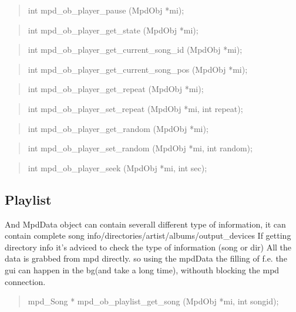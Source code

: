 \documentclass[a4paper,11pt]{article}
\begin{document}
\begin{quote}
int 		mpd\_ob\_player\_pause			(MpdObj *mi);
\end{quote}

\begin{quote}
int 		mpd\_ob\_player\_get\_state			(MpdObj *mi);
\end{quote}

\begin{quote}
int 		mpd\_ob\_player\_get\_current\_song\_id	(MpdObj *mi);
\end{quote}

\begin{quote}
int 		mpd\_ob\_player\_get\_current\_song\_pos	(MpdObj *mi);
\end{quote}

\begin{quote}
int		mpd\_ob\_player\_get\_repeat		(MpdObj *mi);
\end{quote}

\begin{quote}
int		mpd\_ob\_player\_set\_repeat		(MpdObj *mi, int repeat);
\end{quote}

\begin{quote}
int		mpd\_ob\_player\_get\_random		(MpdObj *mi);
\end{quote}

\begin{quote}
int		mpd\_ob\_player\_set\_random		(MpdObj *mi, int random);
\end{quote}

\begin{quote}
int 		mpd\_ob\_player\_seek			(MpdObj *mi, int sec);
\end{quote}

\subsection{Playlist}


And MpdData object can contain severall different type of information, it can contain complete song info/directories/artist/albums/output\_devices
If getting directory info it's adviced to check the type of information (song or dir)
All the data is grabbed from mpd directly.  so using the mpdData the filling of f.e. the gui can happen in the bg(and take a long time), withouth blocking the mpd connection.

\begin{quote}
mpd\_Song * 	mpd\_ob\_playlist\_get\_song		(MpdObj *mi, int songid);
\end{quote}
\end{document}
